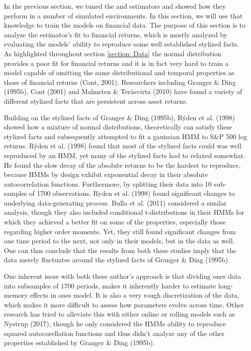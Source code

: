 In the previous section, we tuned the \jump and \mle estimators and showed how they perform in a number of simulated environments. In this section, we will use that knowledge to train the models on financial data. The purpose of this section is to analyze the estimator's fit to financial returns, which is mostly analyzed by evaluating the models' ability to reproduce some well established stylized facts. As highlighted throughout section \ref{section: Data} the normal distribution provides a poor fit for financial returns and it is in fact very hard to train a model capable of omitting the same distributional and temporal properties as those of financial returns (Cont, 2001). Researchers including Granger \& Ding (1995b), Cont (2001) and Malmsten \& Teräsvirta (2010) have found a variety of different stylized facts that are persistent across asset returns. 

Building on the stylized facts of Granger \& Ding (1995b), Rýden et al. (1998) showed how a mixture of normal distributions, theoretically can satisfy these stylized facts and subsequently attempted to fit a gauissian HMM to S\&P 500 log returns. Rýden et al. (1998) found that most of the stylized facts could was well reproduced by an HMM, yet many of the stylized facts had to relaxed somewhat. He found the slow decay of the absolute returns to be the hardest to reproduce, because HMMs by design exhibit exponential decay in their absolute autocorrelation functions. Furthermore, by splitting their data into 10 sub-samples of 1700 observations, Ryden et al. (1998) found significant changes to underlying data-generating process. Bulla et al. (2011) considered a similar analysis, though they also included conditional t-distributions in their HMMs for which they achieved a better fit on some of the properties, especially those regarding higher order moments. Yet, they still found significant changes from one time period to the next, not only in their models, but in the data as well. One can thus conclude that the results from both these studies imply that the data merely fluctuates around the stylized facts of Granger \& Ding (1995b).

One inherent issue with both these author's approach is that dividing ones data into subsamples of 1700 periods, makes it inherently harder to estimate long-memory effects in ones model. It is also a very rough discretization of the data, which makes it more difficult to assess how parameters evolve across time. Other research has tried to alleviate this with either online or rolling models such as Nystrup (2017), though he only considered the HMMs ability to reproduce squared autocorellation functions and thus didn't analyze any of the other properties established by Granger \& Ding (1995b).

